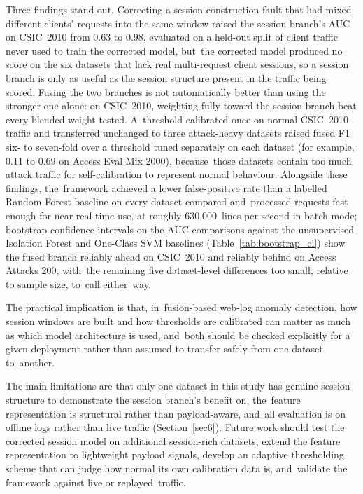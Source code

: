 \documentclass[futureinternet,article,accept,moreauthors]{Definitions/mdpi}
\begin{document}
Three findings stand out. Correcting a session-construction fault that had mixed different clients' requests into the same window raised the session branch's AUC on CSIC~2010 from 0.63 to 0.98, evaluated on a held-out split of client traffic never used to train the corrected model, but~the corrected model produced no score on the six datasets that lack real multi-request client sessions, so a session branch is only as useful as the session structure present in the traffic being scored. Fusing the two branches is not automatically better than using the stronger one alone: on CSIC~2010, weighting fully toward the session branch beat every blended weight tested. A~threshold calibrated once on normal CSIC~2010 traffic and transferred unchanged to three attack-heavy datasets raised fused F1 six- to seven-fold over a threshold tuned separately on each dataset (for example, 0.11 to 0.69 on Access Eval Mix 2000), because~those datasets contain too much attack traffic for self-calibration to represent normal behaviour. Alongside these findings, the~framework achieved a lower false-positive rate than a labelled Random Forest baseline on every dataset compared and~processed requests fast enough for near-real-time use, at roughly \mbox{630{,}000 lines} per second in batch mode; bootstrap confidence intervals on the AUC comparisons against the unsupervised Isolation Forest and One-Class SVM baselines (Table~\ref{tab:bootstrap_ci}) show the fused branch reliably ahead on CSIC~2010 and reliably behind on Access Attacks 200, with~the remaining five dataset-level differences too small, relative to sample size, to~call either~way.

The practical implication is that, in~fusion-based web-log anomaly detection, how session windows are built and how thresholds are calibrated can matter as much as which model architecture is used, and~both should be checked explicitly for a given deployment rather than assumed to transfer safely from one dataset to~another.

The main limitations are that only one dataset in this study has genuine session structure to demonstrate the session branch's benefit on, the~feature representation is structural rather than payload-aware, and~all evaluation is on offline logs rather than live traffic (Section~\ref{sec6}). Future work should test the corrected session model on additional session-rich datasets, extend the feature representation to lightweight payload signals, develop an adaptive thresholding scheme that can judge how normal its own calibration data is, and~validate the framework against live or replayed~traffic.
\end{document}
